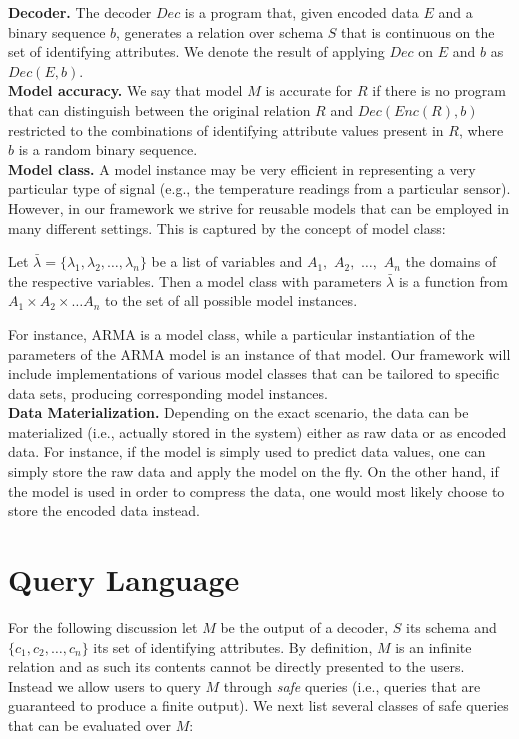 \documentclass{sig-alternate}
\begin{document}
{\bf Decoder.} The decoder $Dec$ is a program that, given encoded data $E$ and a binary sequence $b$, generates a relation over schema $S$ that is continuous on the set of identifying attributes. We denote the result of applying $Dec$ on $E$ and $b$ as $Dec(E, b)$.\\

{\bf Model accuracy.} We say that model $M$ is accurate for $R$ if there is no program that can distinguish between the original relation $R$ and $Dec(Enc(R), b)$ restricted to the combinations of identifying attribute values present in $R$, where $b$ is a random binary sequence.\\

{\bf Model class.} A model instance may be very efficient in representing a very particular type of signal (e.g., the temperature readings from a particular sensor). However, in our framework we strive for reusable models that can be employed in many different settings. This is captured by the concept of model class:

Let $\bar{\lambda} = \{\lambda_1, \lambda_2, \ldots, \lambda_n\}$ be a list of variables and $A_1,$ $A_2,$ $\ldots,$ $A_n$ the domains of the respective variables.  Then a model class with parameters $\bar{\lambda}$ is a function from $A_1 \times A_2 \times \ldots A_n$ to the set of all possible model instances.

For instance, ARMA is a model class, while a particular instantiation of the parameters of the ARMA model is an instance of that model. Our framework will include implementations of various model classes that can be tailored to specific data sets, producing corresponding model instances.\\

{\bf Data Materialization.} Depending on the exact scenario, the data can be materialized (i.e., actually stored in the system) either as raw data or as encoded data. For instance, if the model is simply used to predict data values, one can simply store the raw data and apply the model on the fly. On the other hand, if the model is used in order to compress the data, one would most likely choose to store the encoded data instead.

\section{Query Language}

For the following discussion let $M$ be the output of a decoder, $S$ its schema and $\{c_1, c_2, \ldots, c_n\}$ its set of identifying attributes. By definition, $M$ is an  infinite relation and as such its contents cannot be directly presented to the users. Instead we allow users to query $M$ through \emph{safe} queries (i.e., queries that are guaranteed to produce a finite output). We next list several classes of safe queries that can be evaluated over $M$:
\end{document}
